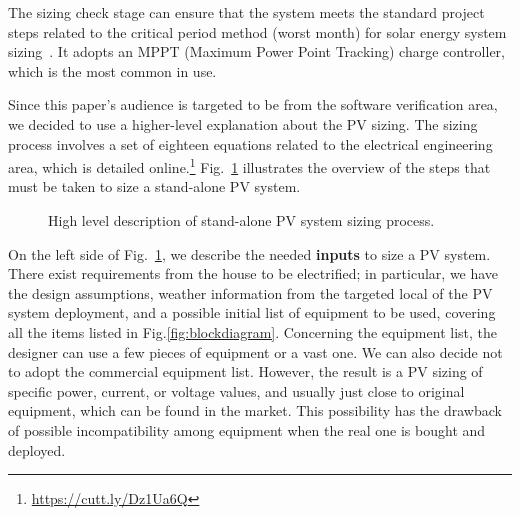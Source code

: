 \documentclass[10pt,journal,compsoc]{IEEEtran}
\begin{document}
The sizing check stage can ensure that the system meets the standard project steps related to the critical period method (worst month) for solar energy system sizing~\cite{Pinho}. It adopts an MPPT (Maximum Power Point Tracking) charge controller, which is the most common in use. 

Since this paper's audience is targeted to be from the software verification area, we decided to use a higher-level explanation about the PV sizing. The sizing process involves a set of eighteen equations related to the electrical engineering area, which is detailed online.\footnote{\url{https://cutt.ly/Dz1Ua6Q}} Fig.~\ref{fig:flow} illustrates the overview of the steps that must be taken to size a stand-alone PV system.
%
\begin{figure}[h]
\centering
\caption{High level description of stand-alone PV system sizing process.}
\label{fig:flow} 
\end{figure}

On the left side of Fig.~\ref{fig:flow}, we describe the needed \textbf{inputs} to size a PV system. There exist requirements from the house to be electrified; in particular, we have the design assumptions, weather information from the targeted local of the PV system deployment, and a possible initial list of equipment to be used, covering all the items listed in Fig.\ref{fig:blockdiagram}. Concerning the equipment list, the designer can use a few pieces of equipment or a vast one. We can also decide not to adopt the commercial equipment list. However, the result is a PV sizing of specific power, current, or voltage values, and usually just close to original equipment, which can be found in the market. This possibility has the drawback of possible incompatibility among equipment when the real one is bought and deployed.
\end{document}
